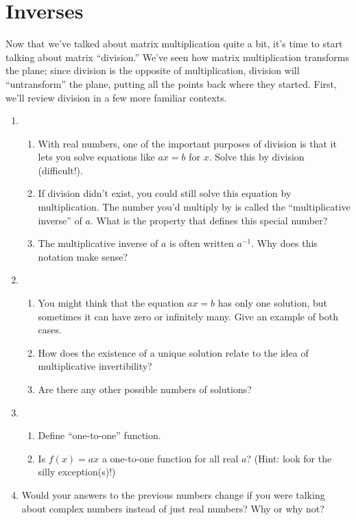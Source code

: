 \documentclass[../gatm.tex]{subfiles}
\begin{document}
\section{Inverses}

Now that we've talked about matrix multiplication quite a bit, it's time to start talking about matrix ``division.'' We've seen how matrix multiplication transforms the plane; since division is the opposite of multiplication, division will ``untransform'' the plane, putting all the points back where they started. First, we'll review division in a few more familiar contexts.

\begin{enumerate}
\item \begin{enumerate}
\item With real numbers, one of the important purposes of division is that it lets you solve equations like $ax=b$ for $x$. Solve this by division (difficult!).
\item If division didn't exist, you could still solve this equation by multiplication. The number you'd multiply by is called the ``multiplicative inverse'' of $a$. What is the property that defines this special number?
\item The multiplicative inverse of $a$ is often written $a^{-1}$. Why does this notation make sense?
\end{enumerate}
\item \begin{enumerate}
\item You might think that the equation $ax=b$ has only one solution, but sometimes it can have zero or infinitely many. Give an example of both cases.
\item How does the existence of a unique solution relate to the idea of multiplicative invertibility?
\item Are there any other possible numbers of solutions?
\end{enumerate}
\item \begin{enumerate}
\item Define ``one-to-one'' function.
\item Is $f(x)=ax$ a one-to-one function for all real $a$? (Hint: look for the silly exception(s)!)
\end{enumerate}
\item Would your answers to the previous numbers change if you were talking about complex numbers instead of just real numbers? Why or why not?
\end{enumerate}
\end{document}
